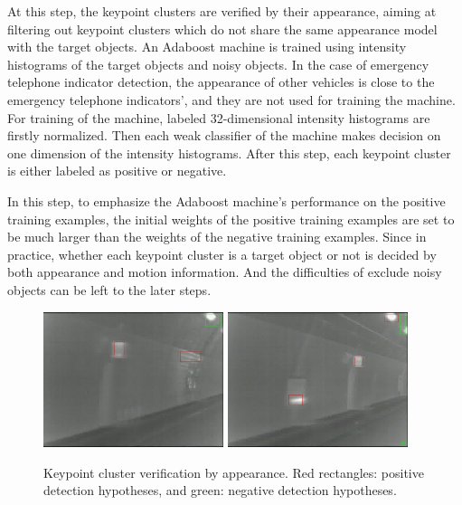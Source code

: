 At this step, the keypoint clusters are verified by their appearance, aiming at filtering out keypoint clusters which do not share the same appearance model with the target objects. An Adaboost machine is trained using intensity histograms of the target objects and noisy objects. In the case of emergency telephone indicator detection, the appearance of other vehicles is close to the emergency telephone indicators', and they are not used for training the machine. For training of the machine, labeled 32-dimensional intensity histograms are firstly normalized. Then each weak classifier of the machine makes decision on one dimension of the intensity histograms. After this step, each keypoint cluster is either labeled as positive or negative.

In this step, to emphasize the Adaboost machine's performance on the positive training examples, the initial weights of the positive training examples are set to be much larger than the weights of the negative training examples.  Since in practice, whether each keypoint cluster is a target object or not is decided by both appearance and motion information. And the difficulties of exclude noisy objects can be left to the later steps.

\begin{figure}[b]
\includegraphics[width=0.47\textwidth,bb=0 0 640 480]{17Rgsimg00039.jpg}
\includegraphics[width=0.47\textwidth,bb=0 0 640 480]{8Rgsimg00028.jpg}
\caption[Keypoint cluster verification by appearance]{Keypoint cluster verification by appearance. Red rectangles: positive detection hypotheses, and green: negative detection hypotheses.}
\label{fig:fif}
\end{figure}

